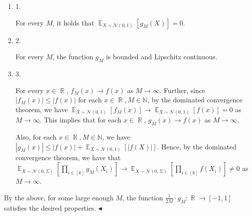 \documentclass[10pt,a4paper]{article}
\begin{document}
\begin{enumerate}


\item[] 
1. 


For every $M$, it holds that $\mathop{\mathbb{E}}_{X\sim\mathcal{N}(0,1)}\left[g_{M}(X)\right]=0$.\par





\item[] 
2. 


For every $M$, the function $g_{M}$ is bounded and Lipschitz continuous.\par





\item[] 
3. 


For every $x\in\mathop{\mathbb{R}}$, $f_{M}(x)\to f(x)$ as $M\to\infty$. Further, since $\left|f_{M}(x)\right|\leqslant\left|f(x)\right|$ for each $x\in\mathop{\mathbb{R}},M\in\mathbb{N}$, by the dominated convergence theorem, we have $\mathop{\mathbb{E}}_{X\sim\mathcal{N}(0,1)}\left[f_{M}(x)\right]\to\mathop{\mathbb{E}}_{X\sim\mathcal{N}(0,1)}\left[f(x)\right]=0$ as $M\to\infty$.
This implies that for each $x\in\mathop{\mathbb{R}}$, $g_{M}(x)\to f(x)$ as $M\to\infty$.\par




Also, for each $x\in\mathop{\mathbb{R}},M\in\mathbb{N}$, we have $\left|g_{M}(x)\right|\leqslant\left|f(x)\right|+\mathop{\mathbb{E}}_{X\sim\mathcal{N}(0,1)}\left[\left|f(X)\right|\right]$. Hence, by the dominated convergence theorem, we have that $\mathop{\mathbb{E}}_{X\sim\mathcal{N}(0,\Sigma)}\left[\prod_{i\in[k]}g_{M}(X_{i})\right]\to\mathop{\mathbb{E}}_{X\sim\mathcal{N}(0,\Sigma)}\left[\prod_{i\in[k]}f(X_{i})\right]\not=0$ as $M\to\infty$.\par





\end{enumerate}




By the above, for some large enough $M$, the function $\frac{1}{2M}\cdot g_{M}:\mathop{\mathbb{R}}\to[-1,1]$ satisfies the desired properties.
$\blacktriangleleft$\par
\end{document}
